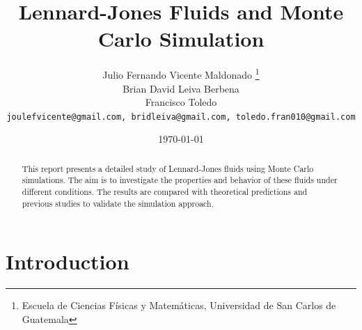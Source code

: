 \documentclass[a4paper,12pt]{article}
\title{Lennard-Jones Fluids and Monte Carlo Simulation}
\author{
    Julio Fernando Vicente Maldonado \thanks{Escuela de Ciencias Físicas y Matemáticas, Universidad de San Carlos de Guatemala} \\
     Brian David Leiva Berbena\footnotemark[1] \\
    Francisco Toledo\footnotemark[1] \\
    \texttt{joulefvicente@gmail.com, bridleiva@gmail.com, 
      toledo.fran010@gmail.com}
}
\date{\today}
\begin{document}
\maketitle

\begin{abstract}
This report presents a detailed study of Lennard-Jones fluids using Monte Carlo simulations. The aim is to investigate the properties and behavior of these fluids under different conditions. The results are compared with theoretical predictions and previous studies to validate the simulation approach.
\end{abstract}

\section{Introduction}
\end{document}
